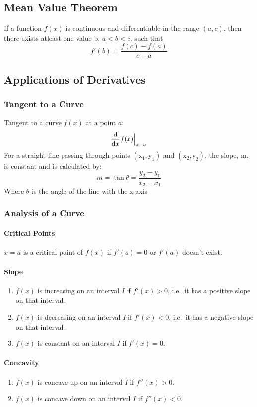 \subsection{Mean Value Theorem}
\begin{thrm}
	If a function $f(x)$ is continuous and differentiable in the range $(a,c)$, then there exists atleast one value b, $a < b < c$, such that
	$$f'(b) = \frac{f(c) - f(a)}{c - a}$$
\end{thrm}
\subsection{Applications of Derivatives}
\subsubsection{Tangent to a Curve}
Tangent to a curve $f(x)$ at a point $a$:
$$\frac{\mathrm{d}}{\mathrm{d}x}f(x)\Big\rvert_{x=a}$$
For a straight line passing through points $\mathrm{(x_1,y_1)}$ and  $\mathrm{(x_2, y_2)}$, the slope, m, is constant and is calculated by:
$$m = \tan\theta = \frac{y_2 - y_1}{x_2 - x_1}$$
Where $\theta$ is the angle of the line with the x-axis

\subsubsection{Analysis of a Curve}
\paragraph{Critical Points}
$x = a$ is a critical point of $ f(x) $ if $ f'(a)=0 $ or $ f'(a) $ doesn't exist.
\paragraph{Slope}
\begin{enumerate}
	\item $ f(x) $ is increasing on an interval $I$ if $f'(x) > 0$, i.e.\ it has a positive slope on that interval.
	\item $f(x)$ is decreasing on an interval $I$ if $f'(x) < 0$, i.e.\ it has a negative slope on that interval.
	\item $f(x)$ is constant on an interval $I$ if $ f'(x) = 0 $.
\end{enumerate}
\paragraph{Concavity}
\begin{enumerate}
	\item $f(x)$ is concave up on an interval $I$ if $ f''(x) > 0 $.
	\item $f(x)$ is concave down on an interval $I$ if $f''(x) < 0 $.
\end{enumerate}
